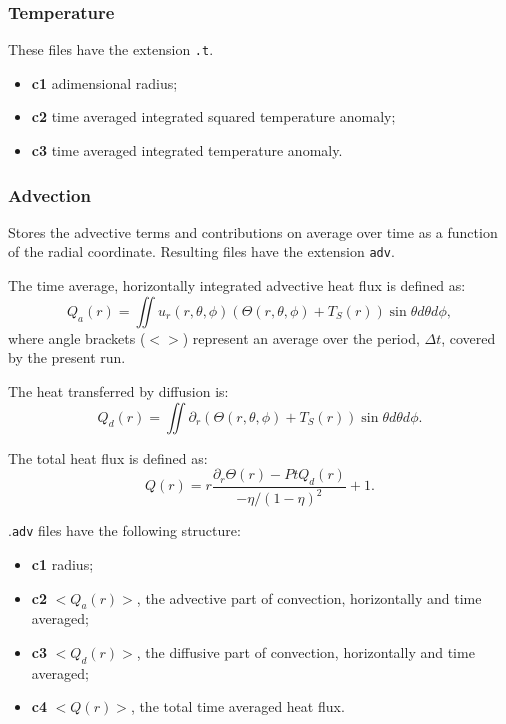 \documentclass[a4paper,10pt]{book}
\begin{document}
\subsubsection{Temperature}
These files have the extension \verb|.t|.
\begin{itemize}
 \item{\bf c1} adimensional radius;
 \item{\bf c2} time averaged integrated squared temperature anomaly;
 \item{\bf c3} time averaged integrated temperature anomaly.
\end{itemize}

\subsubsection{Advection}
Stores the advective terms and contributions on average over time as a function
of the radial coordinate. Resulting files have the extension \verb|adv|.

The time average, horizontally integrated advective heat flux is defined as:
\begin{equation}
Q_a(r) = \iint u_r(r,\theta,\phi)(\Theta(r,\theta,\phi)+T_S(r)) \sin\theta
d\theta d\phi,
\end{equation}
where angle brackets ($<>$) represent an  average over the period, $\Delta t$,
covered by the present run.

The heat transferred by diffusion is:
\begin{equation}
Q_d(r) = \iint \partial_r (\Theta(r,\theta,\phi)+T_S(r)) \sin\theta
d\theta d\phi.
\end{equation}

The total heat flux is defined as:
\begin{equation}
Q(r) = r\frac{\partial_r \Theta(r) - Pt Q_d(r)}{-\eta/(1-\eta)^2} + 1.
\end{equation}

.\verb|adv| files have the following structure:
\begin{itemize}
 \item{\bf c1} radius;
 \item{\bf c2} $<Q_a(r)>$, the advective part of convection, horizontally and
time averaged;
 \item{\bf c3} $<Q_d(r)>$, the diffusive part of convection, horizontally and
time averaged;
 \item{\bf c4} $<Q(r)>$, the total time averaged heat flux.
\end{itemize}
\end{document}
